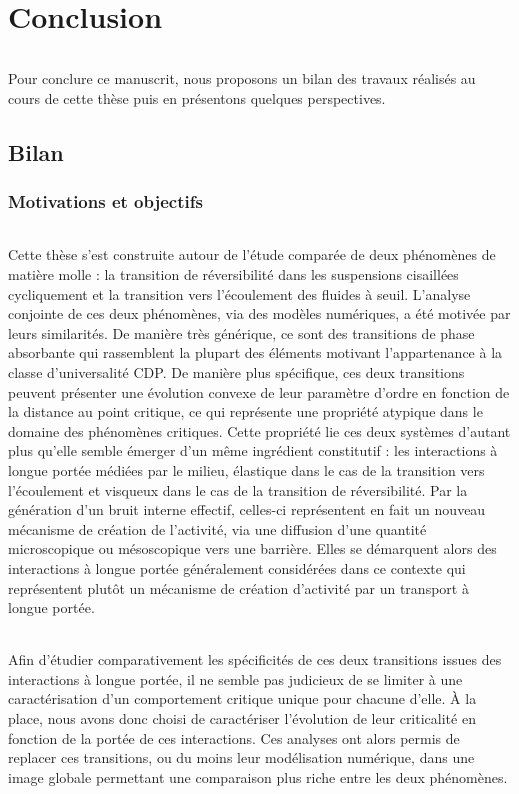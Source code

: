 \chapter*{Conclusion}
\label{chapter:conclusion}

\subparagraph{}Pour conclure ce manuscrit, nous proposons un bilan des travaux réalisés au cours de cette thèse puis en présentons quelques perspectives.

\section*{Bilan}

\subsection*{Motivations et objectifs}

\subparagraph{}Cette thèse s'est construite autour de l'étude comparée de deux phénomènes de matière molle : la transition de réversibilité dans les suspensions cisaillées cycliquement et la transition vers l'écoulement des fluides à seuil. L'analyse conjointe de ces deux phénomènes, via des modèles numériques, a été motivée par leurs similarités. De manière très générique, ce sont des transitions de phase absorbante qui rassemblent la plupart des éléments motivant l'appartenance à la classe d'universalité CDP. De manière plus spécifique, ces deux transitions peuvent présenter une évolution convexe de leur paramètre d'ordre en fonction de la distance au point critique, ce qui représente une propriété atypique dans le domaine des phénomènes critiques. Cette propriété lie ces deux systèmes d'autant plus qu'elle semble émerger d'un même ingrédient constitutif : les interactions à longue portée médiées par le milieu, élastique dans le cas de la transition vers l'écoulement et visqueux dans le cas de la transition de réversibilité. Par la génération d'un bruit interne effectif, celles-ci représentent en fait un nouveau mécanisme de création de l'activité, via une diffusion d'une quantité microscopique ou mésoscopique vers une barrière. Elles se démarquent alors des interactions à longue portée généralement considérées dans ce contexte qui représentent plutôt un mécanisme de création d'activité par un transport à longue portée.

\subparagraph{}Afin d'étudier comparativement les spécificités de ces deux transitions issues des interactions à longue portée, il ne semble pas judicieux de se limiter à une caractérisation d'un comportement critique unique pour chacune d'elle. \`A la place, nous avons donc choisi de caractériser l'évolution de leur criticalité en fonction de la portée de ces interactions. Ces analyses ont alors permis de replacer ces transitions, ou du moins leur modélisation numérique, dans une image globale permettant une comparaison plus riche entre les deux phénomènes.

